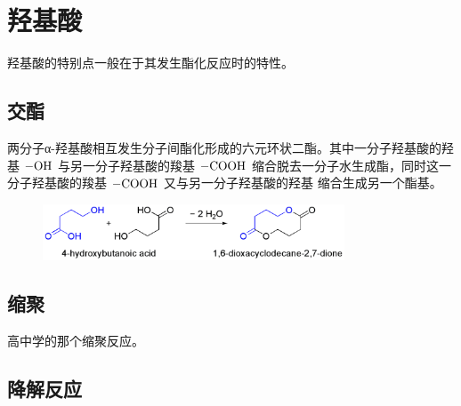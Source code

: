 
\section{羟基酸}

羟基酸的特别点一般在于其发生酯化反应时的特性。

\subsection{交酯}

两分子α-羟基酸相互发生分子间酯化形成的六元环状二酯。其中一分子羟基酸的羟基 $\ce{-OH}$ 与另一分子羟基酸的羧基 $\ce{-COOH}$ 缩合脱去一分子水生成酯，同时这一分子羟基酸的羧基 $\ce{-COOH}$ 又与另一分子羟基酸的羟基  缩合生成另一个酯基。

\begin{figure}[h]
    \centering
    \includegraphics[width=0.8\textwidth]{img/1000px-hydroxybutanoic.png}
\end{figure}

\subsection{缩聚}

高中学的那个缩聚反应。


\subsection{降解反应}
